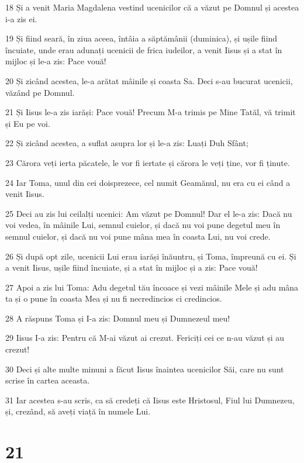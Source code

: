 \par 18 Și a venit Maria Magdalena vestind ucenicilor că a văzut pe Domnul și acestea i-a zis ei.
\par 19 Și fiind seară, în ziua aceea, întâia a săptămânii (duminica), și ușile fiind încuiate, unde erau adunați ucenicii de frica iudeilor, a venit Iisus și a stat în mijloc și le-a zis: Pace vouă!
\par 20 Și zicând acestea, le-a arătat mâinile și coasta Sa. Deci s-au bucurat ucenicii, văzând pe Domnul.
\par 21 Și Iisus le-a zis iarăși: Pace vouă! Precum M-a trimis pe Mine Tatăl, vă trimit și Eu pe voi.
\par 22 Și zicând acestea, a suflat asupra lor și le-a zis: Luați Duh Sfânt;
\par 23 Cărora veți ierta păcatele, le vor fi iertate și cărora le veți ține, vor fi ținute.
\par 24 Iar Toma, unul din cei doisprezece, cel numit Geamănul, nu era cu ei când a venit Iisus.
\par 25 Deci au zis lui ceilalți ucenici: Am văzut pe Domnul! Dar el le-a zis: Dacă nu voi vedea, în mâinile Lui, semnul cuielor, și dacă nu voi pune degetul meu în semnul cuielor, și dacă nu voi pune mâna mea în coasta Lui, nu voi crede.
\par 26 Și după opt zile, ucenicii Lui erau iarăși înăuntru, și Toma, împreună cu ei. Și a venit Iisus, ușile fiind încuiate, și a stat în mijloc și a zis: Pace vouă!
\par 27 Apoi a zis lui Toma: Adu degetul tău încoace și vezi mâinile Mele și adu mâna ta și o pune în coasta Mea și nu fi necredincios ci credincios.
\par 28 A răspuns Toma și I-a zis: Domnul meu și Dumnezeul meu!
\par 29 Iisus I-a zis: Pentru că M-ai văzut ai crezut. Fericiți cei ce n-au văzut și au crezut!
\par 30 Deci și alte multe minuni a făcut Iisus înaintea ucenicilor Săi, care nu sunt scrise în cartea aceasta.
\par 31 Iar acestea s-au scris, ca să credeți că Iisus este Hristosul, Fiul lui Dumnezeu, și, crezând, să aveți viață în numele Lui.

\chapter{21}

